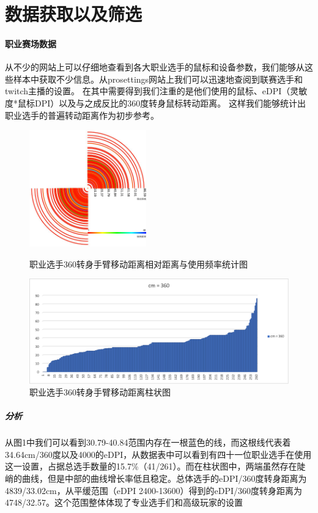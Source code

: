 \documentclass[UTF8]{ctexart}
\begin{document}
\section{数据获取以及筛选}
\paragraph{职业赛场数据}
    从不少的网站上可以仔细地查看到各大职业选手的鼠标和设备参数，我们能够从这些样本中获取不少信息。从prosettings网站上我们可以迅速地查阅到联赛选手和twitch主播的设置。 \cite{prosetting_edpi}在其中需要得到我们注重的是他们使用的鼠标、eDPI（灵敏度*鼠标DPI）以及与之成反比的360度转身鼠标转动距离。 \cite{prosetting_guide}这样我们能够统计出职业选手的普遍转动距离作为初步参考。
\begin{figure}[htbp]
    \centering
    \includegraphics[width=0.45\textwidth]{out.jpg}
    \caption{职业选手360转身手臂移动距离相对距离与使用频率统计图}
    \centering
    \includegraphics[width=1\textwidth]{proDataPoly.png}
    \caption{职业选手360转身手臂移动距离柱状图}
\end{figure}
\subparagraph{分析}
    从图1中我们可以看到30.79-40.84范围内存在一根蓝色的线，而这根线代表着34.64cm/360度以及4000的eDPI，从数据表中可以看到有四十一位职业选手在使用这一设置，占据总选手数量的15.7\%（41/261）。而在柱状图中，两端虽然存在陡峭的曲线，但是中部的曲线增长率低且稳定。总体选手的eDPI/360度转身距离为4839/33.02cm，从平缓范围（eDPI 2400-13600）得到的eDPI/360度转身距离为4748/32.57。这个范围整体体现了专业选手们和高级玩家的设置
\end{document}

